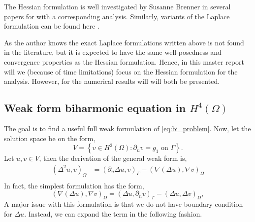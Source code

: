 The Hessian formulation is well investigated by Susanne Brenner in several papers for \cite{brenner2012, brenner2012quadratic, brenner2012quadratic_kirk} with a corresponding analysis. Similarly, variants of the Laplace formulation can be found here
\cite{feng2007fully, georgoulis2009discontinuous}.

\begin{remark}
As the author knows the exact Laplace formulations written above is not found in the literature, but it is expected to have the same well-posedness and convergence properties as the
Hessian formulation. Hence, in this master report will we (because of time limitations) focus on the Hessian formulation for the analysis. However, for the numerical results will will both be presented.
\end{remark}



\subsection{  Weak form biharmonic equation in $H^{4}( \Omega  ) $}%
\label{sub:continious_weak_form_of_biharmonic_equation}

The goal is to find a useful full weak formulation of \eqref{eq:bi_problem}. Now, let the solution space be on the form,
\begin{equation*}
V = \left\{ v \in H^2( \Omega  ) : \partial _{n} v = g_{1}    \text{ on }
\Gamma   \right\}.
\end{equation*}
Let $u,v \in  V$, then the derivation of the general weak form is,
\[
\begin{split}
\left( \Delta ^2 u,v \right) _{\Omega }  &  = \left( \partial _{n} \Delta u, v \right) _{\Gamma  } - \left( \nabla \left( \Delta  u \right) , \nabla v \right) _{\Omega }  \\
\end{split}
\]
In fact, the simplest formulation has the form,
\[
  \left( \nabla \left( \Delta u \right) , \nabla v \right) _{\Omega } =   \left( \Delta u, \partial _{n} v \right) _{\Gamma  } - \left( \Delta u, \Delta v \right)_{\Omega },
\]
A major issue with this formulation is that we do not have boundary condition for $\Delta u$. Instead, we can expand the term in the following fashion.


